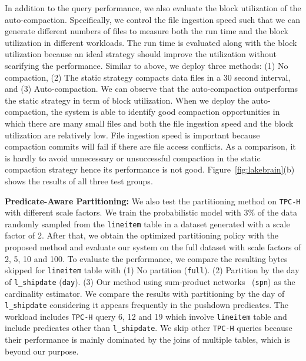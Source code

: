 In addition to the query performance, we also evaluate the block utilization of the auto-compaction. Specifically, we control the file ingestion speed such that we can generate different numbers of files to measure both the run time and the block utilization in different workloads. The run time is evaluated along with the block utilization because an ideal strategy should improve the utilization without scarifying the performance. Similar to above, we deploy three methods: (1) No compaction, (2) The static strategy compacts data files in a 30 second interval, and (3) Auto-compaction. We can observe that the auto-compaction outperforms the static strategy in term of block utilization.  When we deploy the auto-compaction, the system is able to identify good compaction opportunities in which there are many small files and both the file ingestion speed and the block utilization are relatively low. 
File ingestion speed is important because compaction commits will fail if there are file access conflicts. As a comparison, it is hardly to avoid unnecessary or unsuccessful compaction in the static compaction strategy hence its performance is not good. Figure~\ref{fig:lakebrain}(b) shows the results of all three test groups.






\noindent \textbf{Predicate-Aware Partitioning:} We also test the partitioning method on \texttt{TPC-H}  with different scale factors. We train the probabilistic model with 3\% of the data randomly sampled from the \texttt{lineitem} table in a dataset generated with a scale factor of 2. After that, we obtain the optimized partitioning policy with the proposed method and evaluate our system on the full dataset with scale factors of 2, 5, 10 and 100. To evaluate the performance, we compare the resulting bytes skipped for \texttt{lineitem} table with (1) No partition (\texttt{full}). (2) Partition by the day of \texttt{l\_shipdate} (\texttt{day}).  (3) Our  method using sum-product networks~\cite{deepdb}  (\texttt{spn}) as the cardinality estimator.
 We compare the results with partitioning by the day of \texttt{l\_shipdate} considering it appears frequently in the pushdown predicates. The workload includes \texttt{TPC-H} query 6, 12 and 19 which involve \texttt{lineitem} table and include predicates other than \texttt{l\_shipdate}. We skip other \texttt{TPC-H} queries because their performance is  mainly dominated by the joins of multiple tables, which is beyond our purpose.
 

